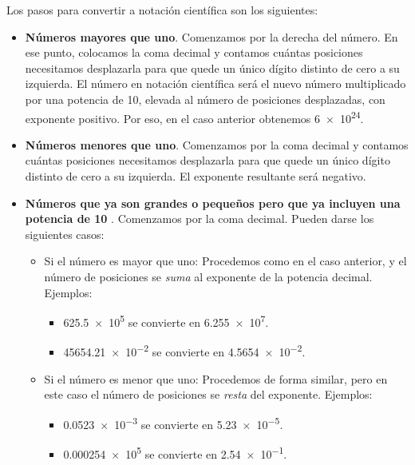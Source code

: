 Los pasos para convertir a notación científica son los siguientes:

\begin{itemize}
    \item \textbf{Números mayores que uno}.
    Comenzamos por la derecha del número.
    En ese punto, colocamos la coma decimal y contamos cuántas posiciones necesitamos desplazarla para que quede un único dígito distinto de cero a su izquierda.
    El número en notación científica será el nuevo número multiplicado por una potencia de 10, elevada al número de posiciones desplazadas, con exponente positivo.
    Por eso, en el caso anterior obtenemos \num{6e24}.

    \item \textbf{Números menores que uno}.
    Comenzamos por la coma decimal y contamos cuántas posiciones necesitamos desplazarla para que quede un único dígito distinto de cero a su izquierda.
    El exponente resultante será negativo.

    \item \textbf{Números que ya son grandes o pequeños pero que ya incluyen una potencia de 10} .
    Comenzamos por la coma decimal.
    Pueden darse los siguientes casos:

    \begin{itemize}
        \item Si el número es mayor que uno:
        Procedemos como en el caso anterior, y el número de posiciones se \emph{suma} al exponente de la potencia decimal. Ejemplos:
        \begin{itemize}
            \item \num{625.5e5} se convierte en \num{6.255e7}.
            \item \num{45654.21e-2} se convierte en \num{4.5654e-2}.
        \end{itemize}

        \item Si el número es menor que uno:
        Procedemos de forma similar, pero en este caso el número de posiciones se \emph{resta} del exponente. Ejemplos:
        \begin{itemize}
            \item \num{0.0523e-3} se convierte en \num{5.23e-5}.
            \item \num{0.000254e5} se convierte en \num{2.54e-1}.
        \end{itemize}
    \end{itemize}
\end{itemize}


